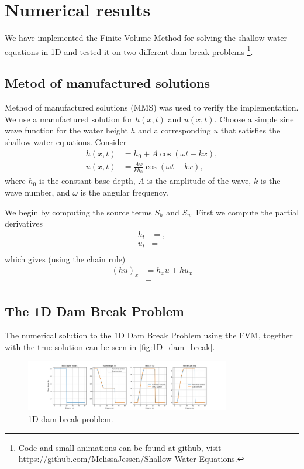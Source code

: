 \chapter{Numerical results}
We have implemented the Finite Volume Method for solving the shallow water equations in 1D and tested it on two different dam break problems
\footnote{Code and small animations can be found at github, visit \url{https://github.com/MelissaJessen/Shallow-Water-Equations}.}.

\section{Metod of manufactured solutions}
Method of manufactured solutions (MMS) was used to verify the implementation.
We use a manufactured solution for $h(x,t)$ and $u(x,t)$.
Choose a simple sine wave function for the water height $h$ and a corresponding $u$ that satisfies the shallow water equations.
Consider
\begin{align*}
    h(x,t) &= h_0 + A \cos(\omega t - kx), \\
    u(x,t) &= \frac{ A \omega }{k h_0}  \cos(\omega t - kx),
\end{align*} 
where $h_0$ is the constant base depth, $A$ is the amplitude of the wave, $k$ is the wave number, and $\omega$ is the angular frequency.

We begin by computing the source terms $S_h$ and $S_u$.
First we compute the partial derivatives
\begin{align*}
    h_t &= ,\\
    u_t &=  \\
\end{align*}
which gives (using the chain rule)
\begin{align*}
    {(hu)}_x &= h_x u + h u_x \\
    &= 
\end{align*}

\section{The 1D Dam Break Problem}
The numerical solution to the 1D Dam Break Problem using the FVM, together with the true solution can be seen in \autoref{fig:1D_dam_break}.

\begin{figure}[H]
    \centering
    \includegraphics[width=0.8\textwidth]{plots/sol_1D_val.png}
    \caption{1D dam break problem.}\label{fig:1D_dam_break}
\end{figure}


